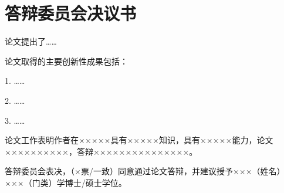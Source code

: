 
\chapter{答辩委员会决议书}

论文提出了……

论文取得的主要创新性成果包括：

1. ……

2. ……

3. ……

论文工作表明作者在×××××具有×××××知识，具有×××××能力，论文××××××××××，答辩×××××××××××××××。

答辩委员会表决，（×票/一致）同意通过论文答辩，并建议授予×××（姓名）×××（门类）学博士/硕士学位。
